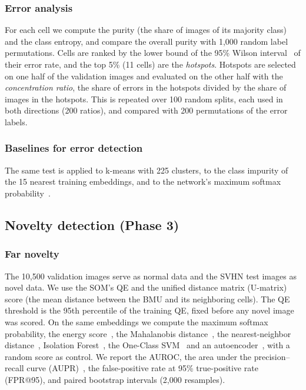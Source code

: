 \documentclass[preprint,review,12pt]{elsarticle}
\begin{document}
\subsubsection{Error analysis}
For each cell we compute the purity (the share of images of its majority class) and the class entropy, and compare the overall purity with 1,000 random label permutations. Cells are ranked by the lower bound of the 95\% Wilson interval~\cite{wilson1927probable} of their error rate, and the top 5\% (11 cells) are the \emph{hotspots}. Hotspots are selected on one half of the validation images and evaluated on the other half with the \emph{concentration ratio}, the share of errors in the hotspots divided by the share of images in the hotspots. This is repeated over 100 random splits, each used in both directions (200 ratios), and compared with 200 permutations of the error labels.

\subsubsection{Baselines for error detection}
The same test is applied to k-means with 225 clusters, to the class impurity of the 15 nearest training embeddings, and to the network's maximum softmax probability~\cite{hendrycks2017baseline}.

\subsection{Novelty detection (Phase 3)}

\subsubsection{Far novelty}
The 10,500 validation images serve as normal data and the SVHN test images as novel data. We use the SOM's QE and the unified distance matrix (U-matrix) score (the mean distance between the BMU and its neighboring cells). The QE threshold is the 95th percentile of the training QE, fixed before any novel image was scored. On the same embeddings we compute the maximum softmax probability, the energy score~\cite{liu2020energy}, the Mahalanobis distance~\cite{lee2018mahalanobis}, the nearest-neighbor distance~\cite{sun2022knn}, Isolation Forest~\cite{liu2008isolation}, the One-Class SVM~\cite{scholkopf2001support} and an autoencoder~\cite{sakurada2014autoencoder}, with a random score as control. We report the AUROC, the area under the precision--recall curve (AUPR)~\cite{saito2015pr}, the false-positive rate at 95\% true-positive rate (FPR@95), and paired bootstrap intervals (2,000 resamples).
\end{document}
